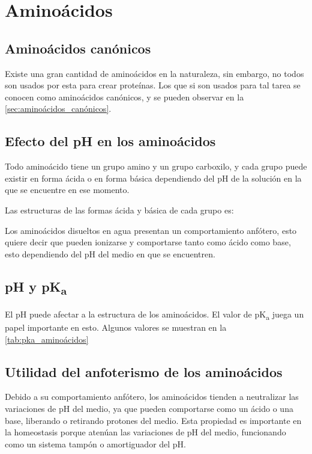 \section{Aminoácidos}

\subsection{Aminoácidos canónicos}

Existe una gran cantidad de aminoácidos en la naturaleza, sin embargo, no todos son usados por esta para crear proteínas. Los que si son usados para tal tarea se conocen como aminoácidos canónicos, y se pueden observar en la \autoref{sec:aminoácidos_canónicos}.

\subsection{Efecto del pH en los aminoácidos}


Todo aminoácido tiene un grupo amino y un grupo carboxilo, y cada grupo puede existir en forma ácida o en forma básica dependiendo del pH de la solución en la que se encuentre en ese momento.

Las estructuras de las formas ácida y básica de cada grupo es:

    

Los aminoácidos disueltos en agua presentan un comportamiento anfótero, esto quiere decir que pueden ionizarse y comportarse tanto como ácido como base, esto dependiendo del pH del medio en que se encuentren.

\subsection{pH y pK\textsubscript{a}}

El pH puede afectar a la estructura de los aminoácidos. El valor de pK\textsubscript{a} juega un papel importante en esto. Algunos valores se muestran en la \autoref{tab:pka_aminoácidos}


\subsection{Utilidad del anfoterismo de los aminoácidos}

Debido a su comportamiento anfótero, los aminoácidos tienden a neutralizar las variaciones de pH del medio, ya que pueden comportarse como un ácido o una base, liberando o retirando protones del medio. Esta propiedad es importante en la homeostasis porque atenúan las variaciones de pH del medio, funcionando como un sistema tampón o amortiguador del pH.

